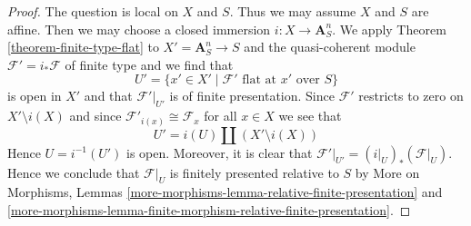 \documentclass[10pt,a4paper]{amsart}
\theoremstyle{plain}
\theoremstyle{definition}
\theoremstyle{remark}
\numberwithin{equation}{subsection}
\begin{document}
\begin{proof}
The question is local on $X$ and $S$. Thus we may assume $X$ and $S$ are affine.
Then we may choose a closed immersion $i : X \to \mathbf{A}^n_S$.
We apply Theorem \ref{theorem-finite-type-flat} to $X' = \mathbf{A}^n_S \to S$
and the quasi-coherent module $\mathcal{F}' = i_*\mathcal{F}$ of finite type
and we find that
$$
U' = \{x' \in X' \mid \mathcal{F}'\text{ flat at }x'\text{ over }S\}
$$
is open in $X'$ and that $\mathcal{F}'|_{U'}$ is of finite presentation.
Since $\mathcal{F}'$ restricts to zero on $X' \setminus i(X)$ and
since $\mathcal{F}'_{i(x)} \cong \mathcal{F}_x$ for all $x \in X$ we see that
$$
U' = i(U) \amalg (X' \setminus i(X))
$$
Hence $U = i^{-1}(U')$ is open. Moreover, it is clear that
$\mathcal{F}'|_{U'} = (i|_U)_*(\mathcal{F}|_U)$.
Hence we conclude that $\mathcal{F}|_U$ is finitely presented
relative to $S$ by More on Morphisms, Lemmas
\ref{more-morphisms-lemma-relative-finite-presentation} and
\ref{more-morphisms-lemma-finite-morphism-relative-finite-presentation}.
\end{proof}
\end{document}

